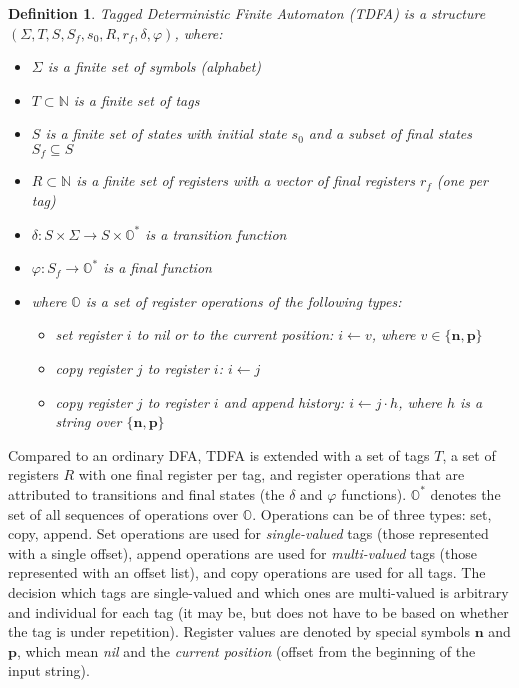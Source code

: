 \documentclass[]{article}
\newtheorem{definition}{Definition}
\newcommand{\YN}{\mathbb{N}}
\newcommand{\YO}{\mathbb{O}}
\begin{document}
\begin{definition} \label{def_tnfa}
Tagged Deterministic Finite Automaton (TDFA)
is a structure $(\Sigma, T, S, S_f, s_0, R, r_{\!f}, \delta, \varphi)$, where:
\begin{itemize}
    \item[] $\Sigma$ is a finite set of symbols (alphabet)
    \item[] $T \subset \YN$ is a finite set of tags
    \item[] $S$ is a finite set of states with initial state $s_0$ and a subset of final states $S_f \subseteq S$
    \item[] $R \subset \YN$ is a finite set of registers with a vector of final registers $r_{\!f}$ (one per tag)
    \item[] $\delta : S \times \Sigma \rightarrow S \times \YO^*$ is a transition function
    \item[] $\varphi : S_f \rightarrow \YO^*$ is a final function
    \medskip
    \item[] where $\YO$ is a set of register operations of the following types:
    \begin{itemize}
        \item[] set register $i$ to nil or to the current position: $i \leftarrow v$, where $v \in \{\mathbf{n}, \mathbf{p}\}$
        \item[] copy register $j$ to register $i$: $i \leftarrow j$
        \item[] copy register $j$ to register $i$ and append history: $i \leftarrow j \cdot h$, where $h$ is a string over $\{\mathbf{n}, \mathbf{p}\}$
    \end{itemize}
\end{itemize}
\end{definition}

Compared to an ordinary DFA, TDFA is extended with a set of tags $T$,
a set of registers $R$ with one final register per tag,
and register operations that are attributed to transitions and final states (the $\delta$ and $\varphi$ functions).
$\YO^*$ denotes the set of all sequences of operations over $\YO$.
Operations can be of three types: set, copy, append.
Set operations are used for \emph{single-valued} tags (those represented with a single offset),
append operations are used for \emph{multi-valued} tags (those represented with an offset list), and
copy operations are used for all tags.
The decision which tags are single-valued and which ones are multi-valued is arbitrary and individual for each tag
(it may be, but does not have to be based on whether the tag is under repetition).
%
Register values are denoted by special symbols $\mathbf{n}$ and $\mathbf{p}$, which mean \emph{nil} and the \emph{current position} (offset from the beginning of the input string).
\medskip
\end{document}
